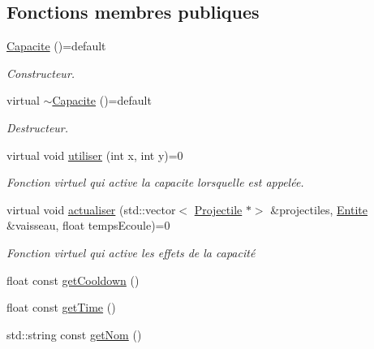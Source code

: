 \subsection*{Fonctions membres publiques}
\begin{DoxyCompactItemize}
\item 
\hyperlink{class_capacite_a8a1aebc5b2332e366a3f207c23b4d363}{Capacite} ()=default
\begin{DoxyCompactList}\small\item\em Constructeur. \end{DoxyCompactList}\item 
virtual \hyperlink{class_capacite_a43be1570a24a64682ff3f034330779a9}{$\sim$\+Capacite} ()=default
\begin{DoxyCompactList}\small\item\em Destructeur. \end{DoxyCompactList}\item 
virtual void \hyperlink{class_capacite_a6f5e6efda11f80ab8538e23f5bdc6e79}{utiliser} (int x, int y)=0
\begin{DoxyCompactList}\small\item\em Fonction virtuel qui active la capacite lorsqu\textquotesingle{}elle est appelée. \end{DoxyCompactList}\item 
virtual void \hyperlink{class_capacite_a75c9621d7a704fedb10ad29c6a697d64}{actualiser} (std\+::vector$<$ \hyperlink{class_projectile}{Projectile} $\ast$$>$ \&projectiles, \hyperlink{class_entite}{Entite} \&vaisseau, float temps\+Ecoule)=0
\begin{DoxyCompactList}\small\item\em Fonction virtuel qui active les effets de la capacité \end{DoxyCompactList}\item 
float const \hyperlink{class_capacite_af07c1c3a2c9259a7eab270b3d8f867de}{get\+Cooldown} ()
\item 
float const \hyperlink{class_capacite_a963dd214cc53c76358b5326d9164884f}{get\+Time} ()
\item 
std\+::string const \hyperlink{class_capacite_a96218b289768ff461ffaaa0abe014a42}{get\+Nom} ()
\end{DoxyCompactItemize}
